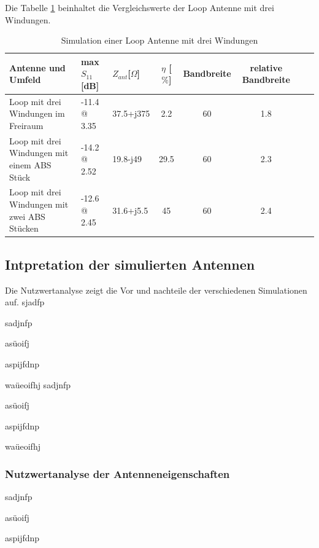 Die Tabelle \ref{tab:Evaluation_Vergeich_Loop_Antennen_Coil} beinhaltet die Vergleichswerte der Loop Antenne mit drei Windungen.
\begin{table}[!h]
  \centering
  \begin{tabular}{p{4cm} p{2cm} l  c c c c r} 
  \toprule 
  Antenne und Umfeld             & max $S_{11}$[dB]		& $Z_{ant}$[$\Omega$] 	& $\eta$ [$\%$] & Bandbreite & relative Bandbreite\\ 
  \midrule
Loop mit drei Windungen  im Freiraum    		&	-11.4 @ 3.35		&  	37.5+j375			&   	2.2	& 60		& 1.8\\          					   		
Loop mit drei Windungen mit einem ABS Stück 	&    -14.2 @ 2.52  		&	19.8-j49			&	29.5	& 60	 	& 2.3\\
Loop mit drei Windungen mit zwei ABS Stücken &    -12.6 @ 2.45    	&	31.6+j5.5		&	45	& 60 	& 2.4\\
 \bottomrule
  \end{tabular}
  \caption{Simulation einer Loop Antenne mit drei Windungen }
  \label{tab:Evaluation_Vergeich_Loop_Antennen_Coil}
\end{table}
\subsection{Intpretation der simulierten Antennen}

Die Nutzwertanalyse zeigt die Vor und nachteile der verschiedenen Simulationen auf.
sjadfp

sadjnfp

asüoifj

aspijfdnp


waüeoifhj
sadjnfp

asüoifj

aspijfdnp


waüeoifhj

\newpage
\subsubsection{Nutzwertanalyse der Antenneneigenschaften }
sadjnfp

asüoifj

aspijfdnp


